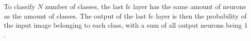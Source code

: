 To classify $N$ number of classes, the last \gls{fc} layer has the same amount of neurons as the amount of classes. The output of the last \gls{fc} layer is then the probability of the input image belonging to each class, with a sum of all output neurons being $1$ \citep{Karpathy2019}.



